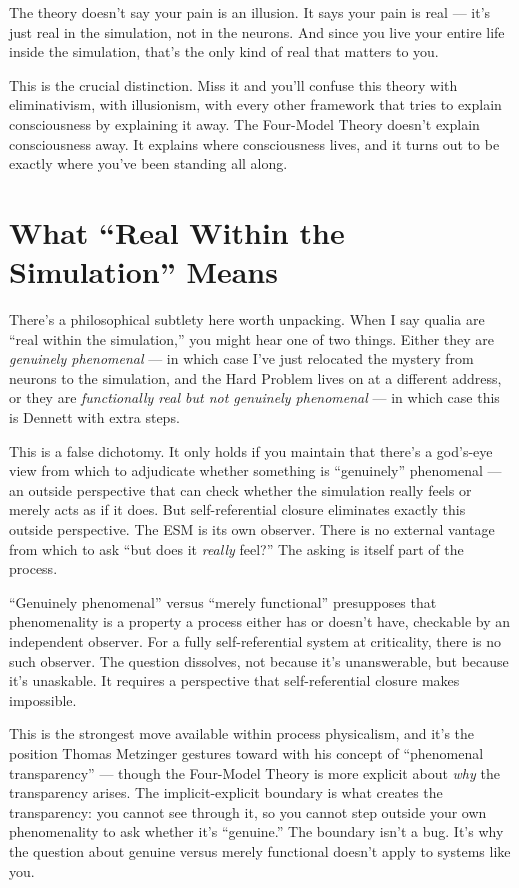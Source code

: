 \documentclass[11pt, twoside, openright]{book}
\begin{document}
The theory doesn't say your pain is an illusion. It says your pain is real --- it's just real in the simulation, not in the neurons. And since you live your entire life inside the simulation, that's the only kind of real that matters to you.

This is the crucial distinction. Miss it and you'll confuse this theory with eliminativism, with illusionism, with every other framework that tries to explain consciousness by explaining it away. The Four-Model Theory doesn't explain consciousness away. It explains where consciousness lives, and it turns out to be exactly where you've been standing all along.

\section*{What ``Real Within the Simulation'' Means}

There's a philosophical subtlety here worth unpacking. When I say qualia are ``real within the simulation,'' you might hear one of two things. Either they are \textit{genuinely phenomenal} --- in which case I've just relocated the mystery from neurons to the simulation, and the Hard Problem lives on at a different address, or they are \textit{functionally real but not genuinely phenomenal} --- in which case this is Dennett with extra steps.

This is a false dichotomy. It only holds if you maintain that there's a god's-eye view from which to adjudicate whether something is ``genuinely'' phenomenal --- an outside perspective that can check whether the simulation really feels or merely acts as if it does. But self-referential closure eliminates exactly this outside perspective. The ESM is its own observer. There is no external vantage from which to ask ``but does it \textit{really} feel?'' The asking is itself part of the process.

``Genuinely phenomenal'' versus ``merely functional'' presupposes that phenomenality is a property a process either has or doesn't have, checkable by an independent observer. For a fully self-referential system at criticality, there is no such observer. The question dissolves, not because it's unanswerable, but because it's unaskable. It requires a perspective that self-referential closure makes impossible.

This is the strongest move available within process physicalism, and it's the position Thomas Metzinger gestures toward with his concept of ``phenomenal transparency'' --- though the Four-Model Theory is more explicit about \textit{why} the transparency arises. The implicit-explicit boundary is what creates the transparency: you cannot see through it, so you cannot step outside your own phenomenality to ask whether it's ``genuine.'' The boundary isn't a bug. It's why the question about genuine versus merely functional doesn't apply to systems like you.
\end{document}
